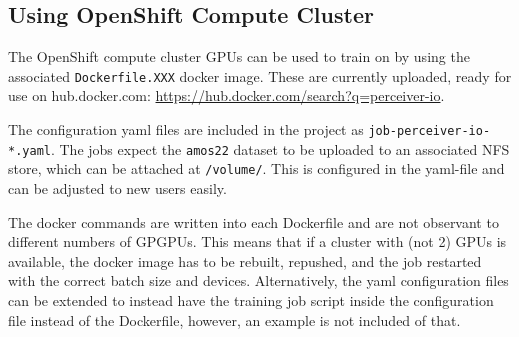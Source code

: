 \subsection{Using OpenShift Compute Cluster}

The OpenShift compute cluster GPUs can be used to train on by using the associated \lstinline{Dockerfile.XXX} docker image. These are currently uploaded, ready for use on hub.docker.com: \url{https://hub.docker.com/search?q=perceiver-io}.

The configuration yaml files are included in the project as \lstinline{job-perceiver-io-*.yaml}. The jobs expect the \lstinline{amos22} dataset to be uploaded to an associated NFS store, which can be attached at \lstinline{/volume/}. This is configured in the yaml-file and can be adjusted to new users easily.

The docker commands are written into each Dockerfile and are not observant to different numbers of GPGPUs. This means that if a cluster with (not 2) GPUs is available, the docker image has to be rebuilt, repushed, and the job restarted with the correct batch size and devices. Alternatively, the yaml configuration files can be extended to instead have the training job script inside the configuration file instead of the Dockerfile, however, an example is not included of that.